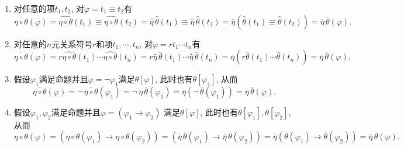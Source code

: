 \documentclass[UTF8]{ctexart}
\begin{document}
\begin{enumerate}
    \item 对任意的项$t_1,t_2$, 对$\varphi=t_1\equiv t_2$有
    \vspace{3pt}
    \[
        \overline{\eta\circ\theta}(\varphi)=
        \widehat{\eta\circ\theta}(t_1)\equiv\widehat{\eta\circ\theta}(t_2)=
        \widehat{\eta}\,\widehat{\theta}(t_1)\equiv
        \widehat{\eta}\,\widehat{\theta}(t_2)=
        \overline{\eta}\left(\widehat{\theta}(t_1)\equiv\widehat{\theta}(t_2)\right)
        =\overline{\eta}\,\overline{\theta}(\varphi).
    \]

    \vspace{3pt}
    \item 对任意的$n$元关系符号$r$和项$t_1,\cdots,t_n$, 对$\varphi=rt_1\cdots t_n$有
    \vspace{3pt}
    \[
        \overline{\eta\circ\theta}(\varphi)=
        r\widehat{\eta\circ\theta}(t_1)\cdots\widehat{\eta\circ\theta}(t_n)=
        r\widehat{\eta}\,\widehat{\theta}(t_1)\cdots
        \widehat{\eta}\,\widehat{\theta}(t_n)=
        \overline{\eta}\left(r\widehat{\theta}(t_1)\cdots\widehat{\theta}(t_n)\right)
        =\overline{\eta}\,\overline{\theta}(\varphi).
    \]
    
    \vspace{3pt}
    \item 假设$\varphi_1$满足命题并且$\varphi=\neg\varphi_1$满足$\theta[\varphi]$,
    此时也有$\theta[\varphi_1]$, 从而
    \vspace{3pt}
    \[
        \overline{\eta\circ\theta}(\varphi)=
        \neg\,\overline{\eta\circ\theta}(\varphi_1)=
        \neg\,\overline{\eta}\,\overline{\theta}(\varphi_1)=
        \overline{\eta}\left(\neg\,\overline{\theta}(\varphi_1)\right)=
        \overline{\eta}\,\overline{\theta}(\varphi).
    \]

    \vspace{3pt}
    \item 假设$\varphi_1,\varphi_2$满足命题并且$\varphi=(\varphi_1\to\varphi_2)$
    满足$\theta[\varphi]$, 此时也有$\theta[\varphi_1],\theta[\varphi_2]$, 从而
    \vspace{3pt}
    \[
        \overline{\eta\circ\theta}(\varphi)=
        \left(\overline{\eta\circ\theta}(\varphi_1)\to
        \overline{\eta\circ\theta}(\varphi_2)\right)=
        \left(\overline{\eta}\,\overline{\theta}(\varphi_1)\to
        \overline{\eta}\,\overline{\theta}(\varphi_2)\right)=
        \overline{\eta}\left(\overline{\theta}(\varphi_1)\to
        \overline{\theta}(\varphi_2)\right)=
        \overline{\eta}\,\overline{\theta}(\varphi).
    \]


\end{enumerate}
\end{document}
